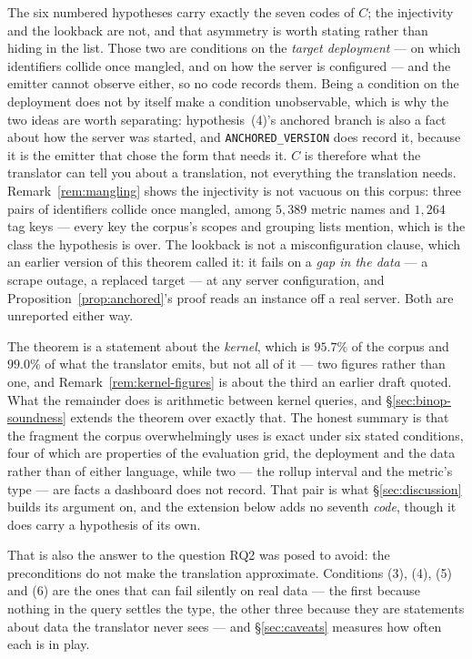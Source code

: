\noindent
The six numbered hypotheses carry exactly the seven codes
of $C$; the injectivity and the lookback are not, and that asymmetry is worth stating rather than hiding in
the list. Those two are conditions on the \emph{target deployment} ---
on which identifiers collide once mangled, and on how the server is configured --- and
the emitter cannot observe either, so no code records them. Being a condition on the
deployment does not by itself make a condition unobservable, which is why the two ideas
are worth separating: hypothesis~(4)'s anchored branch is also a fact about how the
server was started, and \texttt{ANCHORED\_VERSION} does record it, because it is the
emitter that chose the form that needs it. $C$ is therefore what the
translator can tell you about a translation, not everything the translation needs.
Remark~\ref{rem:mangling} shows the injectivity is not vacuous on this corpus: three
pairs of identifiers collide once mangled, among $5{,}389$ metric names and
$1{,}264$ tag keys --- every key the corpus's scopes and grouping lists mention,
which is the class the hypothesis is over. The
lookback is not a misconfiguration clause, which an earlier version of this theorem
called it: it fails on a \emph{gap in the data} --- a scrape outage, a replaced target ---
at any server configuration, and Proposition~\ref{prop:anchored}'s proof reads an
instance off a real server. Both are unreported either way.

\iffull\fi
\iffull\fi

\inlineonly{\noindent}%
The theorem is a statement about the \emph{kernel}, which is $95.7\%$ of the corpus and
$99.0\%$ of what the translator emits, but not all of it --- two figures rather than
one, and Remark~\ref{rem:kernel-figures} is about the third an earlier draft quoted. What the remainder does is
arithmetic between kernel queries, and \S\ref{sec:binop-soundness} extends the theorem
over exactly that. The honest
summary is that the fragment the corpus overwhelmingly uses is exact under six stated
conditions, four of which are properties of the evaluation grid, the deployment and the
data rather than of either language, while two --- the rollup interval and the metric's
type --- are facts a dashboard does not record. That pair is what
\S\ref{sec:discussion} builds its argument on, and the extension below adds no seventh
\emph{code}, though it does carry a hypothesis of its own.

That is also the answer to the question RQ2 was posed to avoid: the preconditions do not
make the translation approximate. Conditions (3), (4), (5) and (6) are the ones that can fail
silently on real data --- the first because nothing in the query settles the type, the
other three because they are statements about data the translator never sees --- and
\S\ref{sec:caveats} measures how often each is in play.

